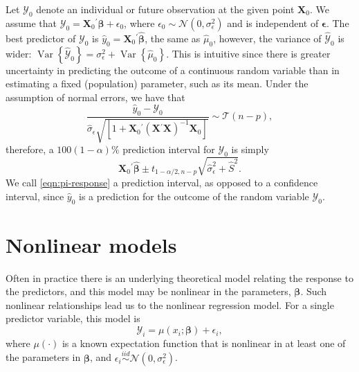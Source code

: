 \documentclass[cmfont,usenames,dvipsnames,leqno]{afit-etd}\usepackage[]{graphicx}\usepackage[]{color}
\newcommand{\trans}{\ensuremath{^\prime}}
\newcommand{\mc}[1]{\ensuremath{\mathcal{#1}}}
\newcommand{\wh}[1]{\ensuremath{\widehat{#1}}}
\newcommand{\tquant}[2]{\ensuremath{t_{#1,#2}}}
\newcommand{\var}{\operatorname{Var}}
\newcommand{\X}{\ensuremath{\bm{X}}}
\begin{document}
Let $\mc{Y}_0$ denote an individual or future observation at the given point $\X_0$. We assume that $\mc{Y}_0 = \X_0\trans\bm{\beta} + \epsilon_0$, where $\epsilon_0 \sim \mc{N}(0, \sigma_\epsilon^2)$ and is independent of $\bm{\epsilon}$. The best predictor of $\mc{Y}_0$ is $\widehat{y}_0 = \X_0\trans\wh{\bm{\beta}}$, the same as $\wh{\mu}_0$, however, the variance of $\widehat{\mc{Y}}_0$ is wider: $\var\left\{\widehat{\mc{Y}}_0\right\} = \sigma_\epsilon^2 + \var\left\{\wh{\mu}_0\right\}$. This is intuitive since there is greater uncertainty in predicting the outcome of a continuous random variable than in estimating a fixed (population) parameter, such as its mean. Under the assumption of normal errors, we have that
\begin{equation*}
  \frac{\widehat{y}_0 - \mc{Y}_0}{\wh{\sigma}_\epsilon\sqrt{\left[1 + \X_0\trans \left( \X\trans\X \right)^{-1} \X_0 \right]}} \sim \mathcal{T}\left(n-p\right),
\end{equation*}
therefore, a $100(1 - \alpha)\%$ prediction interval for $\mc{Y}_0$ is simply
\begin{equation}
\label{eqn:pi-response}
  \X_0\trans\wh{\bm{\beta}} \pm \tquant{1-\alpha/2}{n-p} \sqrt{\wh{\sigma}_\epsilon^2 + \widehat{S}^2}.
\end{equation}
We call \eqref{eqn:pi-response} a prediction interval, as opposed to a confidence interval, since $\widehat{y}_0$ is a prediction for the outcome of the random variable $\mc{Y}_0$.

\section{Nonlinear models}
\label{sec:nonlinear-models}
Often in practice there is an underlying theoretical model relating the response to the predictors, and this model may be nonlinear in the parameters, $\bm{\beta}$. Such nonlinear relationships lead us to the nonlinear regression model. For a single predictor variable, this model is
\begin{equation}
\label{eqn:nonlinemod}
  \mc{Y}_i = \mu(x_i; \bm{\beta}) + \epsilon_i,
\end{equation}
where $\mu(\cdot)$ is a known expectation function that is nonlinear in at least one of the parameters in $\bm{\beta}$, and $\epsilon_i \stackrel{iid}{\sim} \mc{N}(0, \sigma_\epsilon^2)$.
\end{document}
